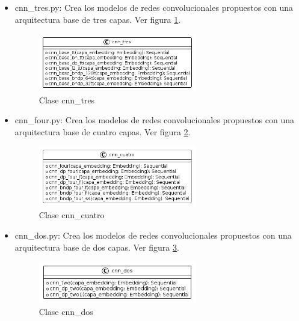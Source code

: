 \begin{itemize}
\item cnn\_tres.py: Crea los modelos de redes convolucionales propuestos con una arquitectura base de tres capas. Ver figura \ref{fig:uml9}.

\begin{figure}
	\includegraphics[width=0.65\textwidth]{capitulo5/figuras/fig9.png}
	\caption{Clase cnn\_tres}
	\label{fig:uml9}
\end{figure}

\item cnn\_four.py: Crea los modelos de redes convolucionales propuestos con una arquitectura base de cuatro capas. Ver figura \ref{fig:uml10}.

\begin{figure}
	\includegraphics[width=0.65\textwidth]{capitulo5/figuras/fig10.png}
	\caption{Clase cnn\_cuatro}
	\label{fig:uml10}
\end{figure}

\item cnn\_dos.py: Crea los modelos de redes convolucionales propuestos con una arquitectura base de dos capas. Ver figura \ref{fig:uml11}.

\begin{figure}
	\includegraphics[width=0.65\textwidth]{capitulo5/figuras/fig11.png}
	\caption{Clase cnn\_dos}
	\label{fig:uml11}
\end{figure}

\end{itemize}

